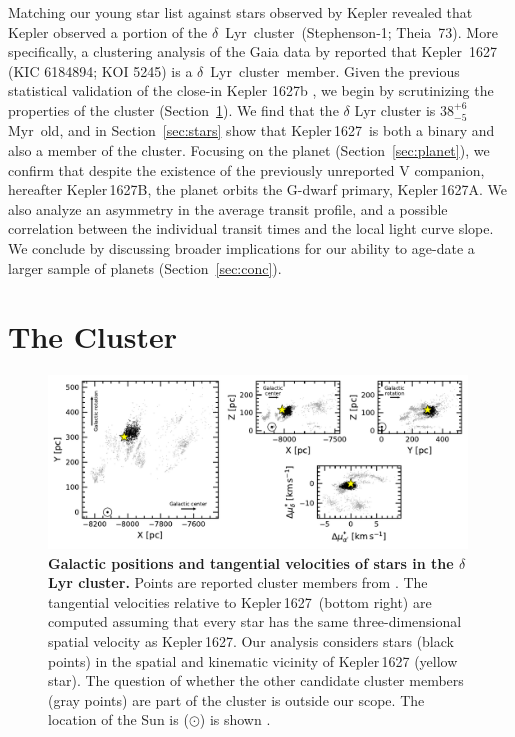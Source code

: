 \documentclass[12pt,modern,twocolumn,tighten]{aastex63}
\newcommand{\cn}{$\delta$\ Lyr\ cluster} %
\newcommand{\sn}{Kepler\,1627} %
\newcommand{\clusterage}{$38^{+6}_{-5}$\,Myr} %
\begin{document}
Matching our young star list against stars observed by Kepler revealed
that Kepler observed a portion of the \cn\ (Stephenson-1; Theia~73).
More specifically, a clustering analysis of the Gaia data by
\citet{KounkelCovey2019} reported that Kepler~1627 (KIC 6184894; KOI
5245) is a \cn\ member.  Given the previous statistical
validation of the close-in  Kepler 1627b
\citep{2012ApJS..199...24T,morton_false_2016,thompson_planetary_2018},
we begin by scrutinizing the properties of the cluster
(Section~\ref{sec:cluster}).  We find that the $\delta$ Lyr cluster is
\clusterage\ old, and in Section~\ref{sec:stars} show that \sn\ is
both a binary and also a member of the cluster.  Focusing on the
planet (Section~\ref{sec:planet}), we confirm that despite the
existence of the previously unreported V companion, hereafter
Kepler\,1627B, the planet orbits the G-dwarf primary, Kepler\,1627A.
We also analyze an asymmetry in the average transit profile, and a
possible correlation between the individual transit times and the
local light curve slope.  We conclude by discussing broader
implications for our ability to age-date a larger sample of planets
(Section~\ref{sec:conc}).


\section{The Cluster}
\label{sec:cluster}

\begin{figure}[t]
	\begin{center}
		\leavevmode
		\includegraphics[width=0.99\textwidth]{f1.pdf}
	\end{center}
	\vspace{-0.7cm}
	\caption{
    {\bf Galactic positions  and tangential velocities of stars in the
    $\delta$\,Lyr cluster.} Points are reported cluster members from
    \citet{KounkelCovey2019}.  The tangential velocities relative to
    \sn\ (bottom right) are computed assuming that every star has the
    same three-dimensional spatial velocity as \sn.  Our analysis
    considers stars (black points) in the spatial and kinematic
    vicinity of Kepler\,1627 (yellow star).  The question of whether
    the other candidate cluster members (gray points) are part of the
    cluster is outside our scope.  The location of the Sun is
    ($\odot$) is shown .
		\label{fig:XYZvtang}
	}
\end{figure}
\end{document}
